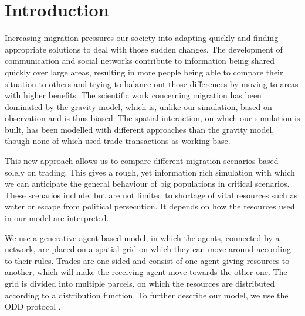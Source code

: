 \documentclass{JASSS}
\begin{document}




\section{Introduction}
Increasing migration pressures our society into adapting quickly and finding appropriate solutions to deal with those sudden changes. The development of communication and social networks contribute to information being shared quickly over large areas, resulting in more people being able to compare their situation to others and trying to balance out those differences by moving to areas with higher benefits. The scientific work concerning migration has been dominated by the gravity model, which is, unlike our simulation, based on observation and is thus biased. The spatial interaction, on which our simulation is built, has been modelled with different approaches than the gravity model, though none of which used trade transactions as working base.

This new approach allows us to compare different migration scenarios based solely on trading. This gives a rough, yet information rich simulation with which we can anticipate the general behaviour of big populations in critical scenarios. These scenarios include, but are not limited to shortage of vital resources such as water or escape from political persecution. It depends on how the resources used in our model are interpreted.

We use a generative agent-based model, in which the agents, connected by a network, are placed on a spatial grid on which they can move around according to their rules. Trades are one-sided and consist of one agent giving resources to another, which will make the receiving agent move towards the other one. The grid is divided into multiple parcels, on which the resources are distributed according to a distribution function. To further describe our model, we use the ODD protocol \citep{odd}.
\end{document}
